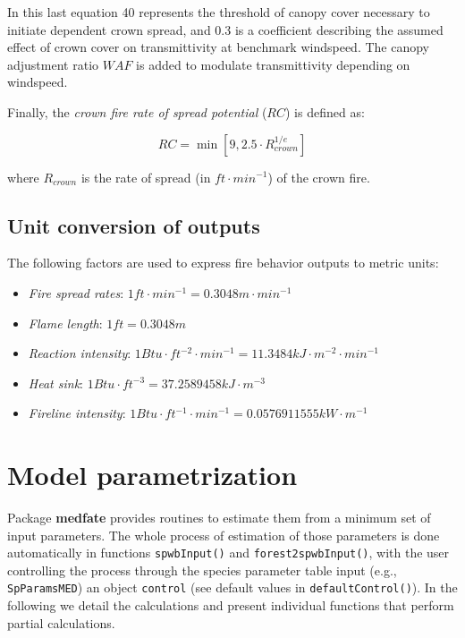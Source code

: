 \documentclass[]{book}
\providecommand{\tightlist}{%
  \setlength{\itemsep}{0pt}\setlength{\parskip}{0pt}}
\begin{document}
In this last equation 40 represents the threshold of canopy cover
necessary to initiate dependent crown spread, and 0.3 is a coefficient
describing the assumed effect of crown cover on transmittivity at
benchmark windspeed. The canopy adjustment ratio \(WAF\) is added to
modulate transmittivity depending on windspeed.

Finally, the \emph{crown fire rate of spread potential} (\(RC\)) is
defined as:

\begin{equation}
RC = \min \left[ 9, 2.5 \cdot R_{crown}^{1/e} \right]
\end{equation}

where \(R_{crown}\) is the rate of spread (in \(ft \cdot min^{-1}\)) of
the crown fire.

\section{Unit conversion of outputs}\label{unit-conversion-of-outputs}

The following factors are used to express fire behavior outputs to
metric units:

\begin{itemize}
\tightlist
\item
  \emph{Fire spread rates}:
  \(1 ft\cdot min^{-1} = 0.3048 m\cdot min^{-1}\)
\item
  \emph{Flame length}: \(1 ft = 0.3048 m\)
\item
  \emph{Reaction intensity}:
  \(1 Btu\cdot ft^{-2} \cdot min^{-1} = 11.3484 kJ \cdot m^{-2}\cdot min^{-1}\)
\item
  \emph{Heat sink}: \(1 Btu\cdot ft^{-3} = 37.2589458 kJ \cdot m^{-3}\)
\item
  \emph{Fireline intensity}:
  \(1 Btu\cdot ft^{-1} \cdot min^{-1} = 0.0576911555 kW\cdot m^{-1}\)
\end{itemize}

\appendix


\chapter{Model parametrization}\label{model-parametrization}

Package \textbf{medfate} provides routines to estimate them from a
minimum set of input parameters. The whole process of estimation of
those parameters is done automatically in functions \texttt{spwbInput()}
and \texttt{forest2spwbInput()}, with the user controlling the process
through the species parameter table input (e.g., \texttt{SpParamsMED})
an object \texttt{control} (see default values in
\texttt{defaultControl()}). In the following we detail the calculations
and present individual functions that perform partial calculations.
\end{document}
